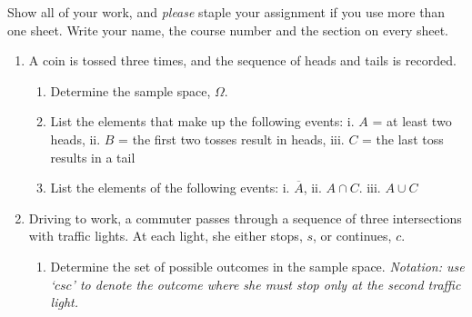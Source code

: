 \documentclass[10pt]{article}
\newcommand{\ansfont}[1]{{\textcolor{blue}{\textbf{Answer:}}\ \ #1}}
\renewcommand{\ansfont}[1]{}
\begin{document}
\pagestyle{fancy} 
Show all of your work, and \emph{please} staple your assignment if you use more than one sheet. Write your name, the course number and the section on every sheet. 

\begin{enumerate} 
  \item A coin is tossed three times, and the sequence of heads and tails is recorded.
    \begin{enumerate}
      \item Determine the sample space, $\Omega$.
      \item List the elements that make up the following events: i. $A$ = at least two heads,
        ii. $B$ = the first two tosses result in heads, iii. $C$ = the last toss results in a tail
      \item List the elements of the following events: i. $\overline{A}$, ii. $A\cap C$. iii. $A \cup C$
    \end{enumerate}
    \ansfont{
      \begin{enumerate}
        \item Let $H$ and $T$ stand for the events of head and tail, respectively. \emph{Ergo}, the sample space is
          $$\Omega=\{HHH, HHT, HTH, HTT, THH, THT, TTH, TTT\}$$
        \item \begin{enumerate}
            \item $A=\text{at least two heads}=\{HHH, HHT, THH, HTH\}$
            \item $B=\text{the first two tosses result in heads}=\{HHT, HHH\}$
            \item $C=\text{the last toss results in a tail}=\{HHT, HTT, THT, TTT\}$
          \end{enumerate}
        \item \begin{enumerate}
            \item $\bar{A}=\Omega\setminus A=\{HTT, THT, TTH, TTT\}=\text{at most one head}$
            \item $A\cap C=\{HHT\}$
            \item $A\cup C=\{HHH, HHT, THH, HTH, HTT, THT, TTT\}=$ at least two heads or the last toss results in a tail
          \end{enumerate}
      \end{enumerate}
    }

  \item
    Driving to work, a commuter passes through a sequence of three
    intersections with traffic lights. At each light, she either stops, $s$, or continues, $c$.
    \begin{enumerate}
      \item %
        \label{lights}
        Determine the set of possible outcomes in the sample space.
        \emph{Notation: use `$csc$' to denote the outcome where she must stop only at the second traffic light.}




\end{enumerate}
\end{enumerate}
\end{document}
